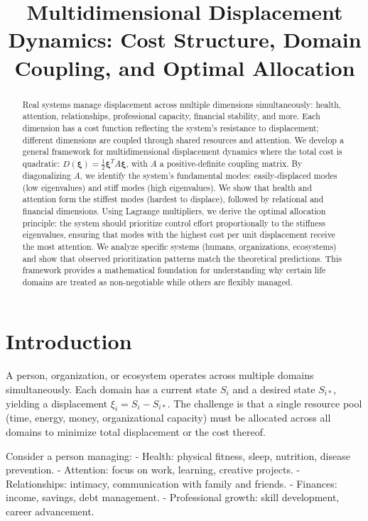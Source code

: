 \documentclass[12pt]{article}
\title{Multidimensional Displacement Dynamics: Cost Structure, Domain Coupling, and Optimal Allocation}
\author{}
\date{}
\begin{document}
\maketitle

\begin{abstract}
Real systems manage displacement across multiple dimensions simultaneously: health, attention, relationships, professional capacity, financial stability, and more. Each dimension has a cost function reflecting the system's resistance to displacement; different dimensions are coupled through shared resources and attention. We develop a general framework for multidimensional displacement dynamics where the total cost is quadratic: $D(\boldsymbol{\xi}) = \frac{1}{2} \boldsymbol{\xi}^T A \boldsymbol{\xi}$, with $A$ a positive-definite coupling matrix. By diagonalizing $A$, we identify the system's fundamental modes: easily-displaced modes (low eigenvalues) and stiff modes (high eigenvalues). We show that health and attention form the stiffest modes (hardest to displace), followed by relational and financial dimensions. Using Lagrange multipliers, we derive the optimal allocation principle: the system should prioritize control effort proportionally to the stiffness eigenvalues, ensuring that modes with the highest cost per unit displacement receive the most attention. We analyze specific systems (humans, organizations, ecosystems) and show that observed prioritization patterns match the theoretical predictions. This framework provides a mathematical foundation for understanding why certain life domains are treated as non-negotiable while others are flexibly managed.
\end{abstract}

\section{Introduction}

A person, organization, or ecosystem operates across multiple domains simultaneously. Each domain has a current state $S_i$ and a desired state $S_{i*}$, yielding a displacement $\xi_i = S_i - S_{i*}$. The challenge is that a single resource pool (time, energy, money, organizational capacity) must be allocated across all domains to minimize total displacement or the cost thereof.

Consider a person managing:
- Health: physical fitness, sleep, nutrition, disease prevention.
- Attention: focus on work, learning, creative projects.
- Relationships: intimacy, communication with family and friends.
- Finances: income, savings, debt management.
- Professional growth: skill development, career advancement.
\end{document}
